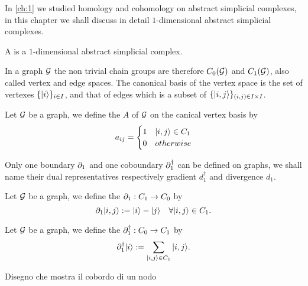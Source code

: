 \documentclass[../2.tex]{subfiles}
\begin{document}
    In \autoref{ch:1} we studied homology and cohomology on abstract simplicial complexes, in this chapter we shall discuss in detail
    $1$-dimensional abstract simplicial complexes.

    \begin{defn}
        A  is a $1$-dimensional abstract simplicial complex.
    \end{defn}

    In a graph $\mathcal{G}$ the non trivial chain groups are therefore $C_0(\mathcal{G})$ and $C_1(\mathcal{G})$, also called vertex and edge spaces. 
    The canonical basis of the vertex space is the set of vertexes $\{| i \rangle\}_{i \in I}$, and that of edges which is a subset of $\{| i,j \rangle\}_{(i,j)\in I\times I}$.

    \begin{defn}
        Let $\mathcal{G}$ be a graph, we define the  $A$ of $\mathcal{G}$ on the canical vertex basis by
        \[a_{ij} = 
        \begin{cases}
            1 & | i,j \rangle \in C_1 \\
            0 & otherwise \\
        \end{cases} \]        
    \end{defn}
    Only one boundary $\partial_1$ and one coboundary $\partial_1^\dagger$ can be defined on graphs, we shall name their dual representatives  respectively gradient $d_1^\dagger$ and divergence $d_1$.

    \begin{defn}
        Let $\mathcal{G}$ be a graph, we define the  $\partial_1 : C_1 \to C_0$ by 
        \[ \partial_1| i,j \rangle := | i \rangle - | j \rangle \quad \forall | i,j \rangle \in C_1.\]
    \end{defn}
    
    \begin{defn}
        Let $\mathcal{G}$ be a graph, we define the  $\partial^\dagger_1 : C_0 \to C_1$ by 
        \[ \partial^\dagger_1| i \rangle := \sum_{| i,j \rangle \in C_1} | i,j \rangle.\]
    \end{defn}

    {\color{red} Disegno che mostra il cobordo di un nodo}


\end{document}
